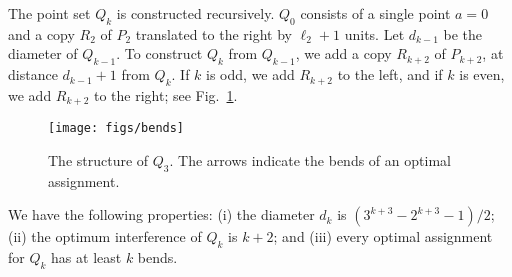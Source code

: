 \documentclass[envcountsect,envcountsame,runningheads,a4paper]{llncs}
\begin{document}
The point set $Q_k$ is constructed recursively.
$Q_0$ consists of a single point $a = 0$ and a copy $R_2$
of $P_2$ translated to the right by $\ell_2 + 1$ units.
Let $d_{k-1}$ be the diameter of $Q_{k-1}$.
To construct $Q_k$ from $Q_{k-1}$, we add a copy $R_{k+2}$ of
$P_{k+2}$, at distance $d_{k-1} + 1$ from $Q_k$. If $k$ is odd,
we add $R_{k+2}$ to the left, and if $k$ is even,
we add $R_{k+2}$ to the right; see Fig.~\ref{fig:bends}.
\begin{figure}
\centering
\texttt{[image: figs/bends]}
\caption{The structure of $Q_3$. The arrows indicate the
bends of an optimal assignment.}
\label{fig:bends}
\end{figure}

\begin{theorem}
We have the following properties: (i) the diameter
$d_k$ is $(3^{k+3}-2^{k+3}-1)/2$;
(ii) the optimum interference of $Q_k$ is $k + 2$; and (iii) every optimal
assignment for $Q_k$ has at least $k$ bends.
\end{theorem}
\end{document}
